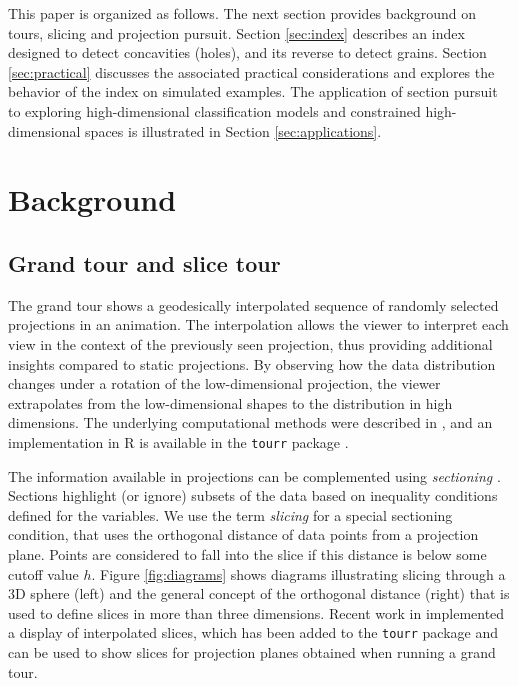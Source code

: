 \documentclass[]{interact}
\theoremstyle{plain}%
\theoremstyle{definition}
\theoremstyle{remark}
\begin{document}
This paper is organized as follows. The next section provides background
on tours, slicing and projection pursuit. Section \ref{sec:index}
describes an index designed to detect concavities (holes), and its
reverse to detect grains. Section \ref{sec:practical} discusses the
associated practical considerations and explores the behavior of the
index on simulated examples. The application of section pursuit to
exploring high-dimensional classification models and constrained
high-dimensional spaces is illustrated in Section
\ref{sec:applications}.

\hypertarget{background}{%
\section{\texorpdfstring{Background
\label{sec:background}}{Background }}\label{background}}

\hypertarget{grand-tour-and-slice-tour}{%
\subsection{Grand tour and slice tour}\label{grand-tour-and-slice-tour}}

The grand tour shows a geodesically interpolated sequence of randomly
selected projections in an animation. The interpolation allows the
viewer to interpret each view in the context of the previously seen
projection, thus providing additional insights compared to static
projections. By observing how the data distribution changes under a
rotation of the low-dimensional projection, the viewer extrapolates from
the low-dimensional shapes to the distribution in high dimensions. The
underlying computational methods were described in \citet{BCAH05}, and
an implementation in R \citep{rlang} is available in the \texttt{tourr}
package \citep{tourr}.

The information available in projections can be complemented using
\textit{sectioning} \citep{prosection}. Sections highlight (or ignore)
subsets of the data based on inequality conditions defined for the
variables. We use the term \textit{slicing} for a special sectioning
condition, that uses the orthogonal distance of data points from a
projection plane. Points are considered to fall into the slice if this
distance is below some cutoff value \(h\). Figure \ref{fig:diagrams}
shows diagrams illustrating slicing through a 3D sphere (left) and the
general concept of the orthogonal distance (right) that is used to
define slices in more than three dimensions. Recent work in
\citet{laa2019slice} implemented a display of interpolated slices, which
has been added to the \texttt{tourr} package and can be used to show
slices for projection planes obtained when running a grand tour.
\end{document}
